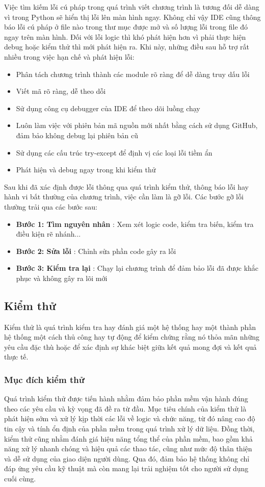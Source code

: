 \documentclass[12pt,letterpaper]{article}
\begin{document}
Việc tìm kiếm lỗi cú pháp trong quá trình viết chương trình là tương đối dễ dàng vì trong Python sẽ hiển thị lỗi lên màn hình ngay. Không chỉ vậy IDE cũng thông báo lỗi cú pháp ở file nào trong thư mục được mở và số lượng lỗi trong file đó ngay trên màn hình.
Đối với lỗi logic thì khó phát hiện hơn vì phải thực hiện debug hoặc kiểm thử thì mới phát hiện ra. Khi này, những điều sau hỗ trợ rất nhiều trong việc hạn chế và phát hiện lỗi:
\begin{itemize}
    \item Phân tách chương trình thành các module rõ ràng để dễ dàng truy dấu lỗi
    \item Viết mã rõ ràng, dễ theo dỗi
    \item Sử dụng công cụ debugger của IDE để theo dõi luồng chạy
    \item Luôn làm việc với phiên bản mã nguồn mới nhất bằng cách sử dụng GitHub, đảm bảo không debug lại phiên bản cũ
    \item Sử dụng các cấu trúc try-except để định vị các loại lỗi tiềm ẩn
    \item Phát hiện và debug ngay trong khi kiểm thử
\end{itemize}

Sau khi đã xác định được lỗi thông qua quá trình kiểm thử, thông báo lỗi hay hành vi bất thường của chương trình, việc cần làm là gỡ lỗi. Các bước gỡ lỗi thường trải qua các bước sau:
\begin{itemize}
    \item \textbf{Bước 1: Tìm nguyên nhân} : Xem xét logic code, kiểm tra biến, kiểm tra điều kiện rẽ nhánh...
    \item \textbf{Bước 2: Sửa lỗi} : Chỉnh sửa phần code gây ra lỗi
    \item \textbf{Bước 3: Kiểm tra lại} : Chạy lại chương trình để đảm bảo lỗi đã được khắc phục và không gây ra lõi mới
\end{itemize}
\subsection{Kiểm thử}
Kiểm thử là quá trình kiểm tra hay đánh giá một hệ thống hay một thành phần hệ thống một cách thủ công hay tự động để kiểm chứng rằng nó thỏa mãn những yêu cầu đặc thù hoặc để xác định sự khác biệt  giữa kết quả mong đợi và kết quả thực tế.

\subsubsection{Mục đích kiểm thử} 
Quá trình kiểm thử được tiến hành nhằm đảm bảo phần mềm vận hành đúng theo các yêu cầu và kỳ vọng đã đề ra từ đầu. Mục tiêu chính của kiểm thử là phát hiện sớm và xử lý kịp thời các lỗi về logic và chức năng, từ đó nâng cao độ tin cậy và tính ổn định của phần mềm trong quá trình xử lý dữ liệu. Đồng thời, kiểm thử cũng nhằm đánh giá hiệu năng tổng thể của phần mềm, bao gồm khả năng xử lý nhanh chóng và hiệu quả các thao tác, cũng như mức độ thân thiện và dễ sử dụng của giao diện người dùng. Qua đó, đảm bảo hệ thống không chỉ đáp ứng yêu cầu kỹ thuật mà còn mang lại trải nghiệm tốt cho người sử dụng cuối cùng.
\end{document}
